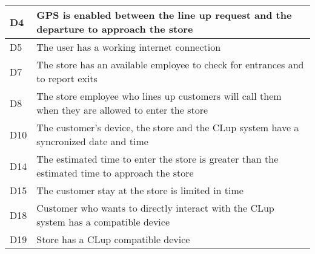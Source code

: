 \begin{center}
{\begin{longtable}{L{2cm}L{12cm}}
        \hline
         D4 & GPS is enabled between the line up request and the departure to approach the store \\
        \hline
         D5 & The user has a working internet connection \\
        \hline
         D7 & The store has an available employee to check for entrances and to report exits \\
        \hline
         D8 & The store employee who lines up customers will call them when they are allowed to enter the store \\
        \hline
         D10 & The customer’s device, the store and the CLup system have a syncronized date and time \\
        \hline
         D14 & The estimated time to enter the store is greater than the estimated time to approach the store \\
        \hline
         D15 & The customer stay at the store is limited in time \\
        \hline
         D18 & Customer who wants to directly interact with the CLup system has a compatible device \\
        \hline
         D19 & Store has a CLup compatible device \\
        \hline
    \end{longtable}}


\end{center}
